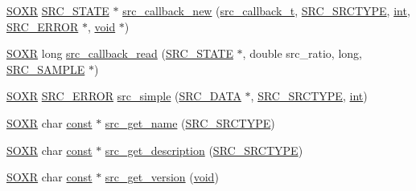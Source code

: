 \begin{DoxyCompactItemize}
\item 
\hyperlink{soxr_8h_a9c39f225365ddf49e46ae9e6ae9b990a}{S\+O\+XR} \hyperlink{lsr_8c_af3b690745d177a40cb1ba01f5804378b}{S\+R\+C\+\_\+\+S\+T\+A\+TE} $\ast$ \hyperlink{soxr-lsr_8h_a780e57ba52fedf62a86654640fb6ccbc}{src\+\_\+callback\+\_\+new} (\hyperlink{soxr-lsr_8h_a31bec2c13aee016a1c3855a75e757f11}{src\+\_\+callback\+\_\+t}, \hyperlink{soxr-lsr_8h_a2e2a328e11ac7ce361f7e02d854a172f}{S\+R\+C\+\_\+\+S\+R\+C\+T\+Y\+PE}, \hyperlink{xmltok_8h_a5a0d4a5641ce434f1d23533f2b2e6653}{int}, \hyperlink{soxr-lsr_8h_a430d922cd937a18ab0bce9f817baecfe}{S\+R\+C\+\_\+\+E\+R\+R\+OR} $\ast$, \hyperlink{sound_8c_ae35f5844602719cf66324f4de2a658b3}{void} $\ast$)
\item 
\hyperlink{soxr_8h_a9c39f225365ddf49e46ae9e6ae9b990a}{S\+O\+XR} long \hyperlink{soxr-lsr_8h_ac65cd51f7e214c52d8ca73191be8eb26}{src\+\_\+callback\+\_\+read} (\hyperlink{lsr_8c_af3b690745d177a40cb1ba01f5804378b}{S\+R\+C\+\_\+\+S\+T\+A\+TE} $\ast$, double src\+\_\+ratio, long, \hyperlink{soxr-lsr_8h_aeed0ef55cbeaa78637727866e9ea4be8}{S\+R\+C\+\_\+\+S\+A\+M\+P\+LE} $\ast$)
\item 
\hyperlink{soxr_8h_a9c39f225365ddf49e46ae9e6ae9b990a}{S\+O\+XR} \hyperlink{soxr-lsr_8h_a430d922cd937a18ab0bce9f817baecfe}{S\+R\+C\+\_\+\+E\+R\+R\+OR} \hyperlink{soxr-lsr_8h_a7fa8266ff4ac4cb912691638cb629e76}{src\+\_\+simple} (\hyperlink{struct_s_r_c___d_a_t_a}{S\+R\+C\+\_\+\+D\+A\+TA} $\ast$, \hyperlink{soxr-lsr_8h_a2e2a328e11ac7ce361f7e02d854a172f}{S\+R\+C\+\_\+\+S\+R\+C\+T\+Y\+PE}, \hyperlink{xmltok_8h_a5a0d4a5641ce434f1d23533f2b2e6653}{int})
\item 
\hyperlink{soxr_8h_a9c39f225365ddf49e46ae9e6ae9b990a}{S\+O\+XR} char \hyperlink{getopt1_8c_a2c212835823e3c54a8ab6d95c652660e}{const} $\ast$ \hyperlink{soxr-lsr_8h_a30dbc4911e662293417cc1cf95a856c6}{src\+\_\+get\+\_\+name} (\hyperlink{soxr-lsr_8h_a2e2a328e11ac7ce361f7e02d854a172f}{S\+R\+C\+\_\+\+S\+R\+C\+T\+Y\+PE})
\item 
\hyperlink{soxr_8h_a9c39f225365ddf49e46ae9e6ae9b990a}{S\+O\+XR} char \hyperlink{getopt1_8c_a2c212835823e3c54a8ab6d95c652660e}{const} $\ast$ \hyperlink{soxr-lsr_8h_ae51ee2cf114f393bdea66609a69f5200}{src\+\_\+get\+\_\+description} (\hyperlink{soxr-lsr_8h_a2e2a328e11ac7ce361f7e02d854a172f}{S\+R\+C\+\_\+\+S\+R\+C\+T\+Y\+PE})
\item 
\hyperlink{soxr_8h_a9c39f225365ddf49e46ae9e6ae9b990a}{S\+O\+XR} char \hyperlink{getopt1_8c_a2c212835823e3c54a8ab6d95c652660e}{const} $\ast$ \hyperlink{soxr-lsr_8h_aeb019f98200ac7d8474e9397eef7527b}{src\+\_\+get\+\_\+version} (\hyperlink{sound_8c_ae35f5844602719cf66324f4de2a658b3}{void})

\end{DoxyCompactItemize}

